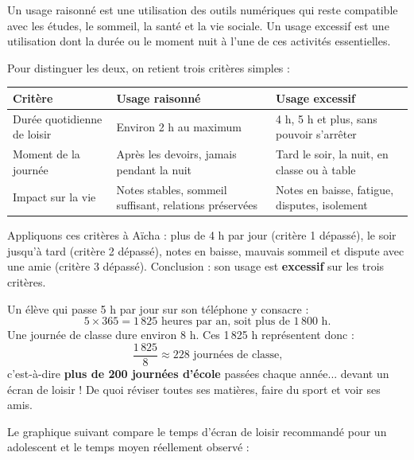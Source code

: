 \documentclass[11pt]{article}
\newcommand{\cle}[1]{{\popxbold\color{popdark}#1}}
\begin{document}
\begin{definition}
Un \cle{usage raisonné} est une utilisation des outils numériques qui reste compatible avec les études, le sommeil, la santé et la vie sociale. Un \cle{usage excessif} est une utilisation dont la durée ou le moment nuit à l'une de ces activités essentielles.
\end{definition}

Pour distinguer les deux, on retient trois critères simples :

\begin{center}
\begin{tabularx}{\linewidth}{|l|X|X|}
\hline
\rowcolor{popblueL} \textbf{Critère} & \textbf{Usage raisonné} & \textbf{Usage excessif} \\
\hline
Durée quotidienne de loisir & Environ 2 h au maximum & 4 h, 5 h et plus, sans pouvoir s'arrêter \\
\hline
Moment de la journée & Après les devoirs, jamais pendant la nuit & Tard le soir, la nuit, en classe ou à table \\
\hline
Impact sur la vie & Notes stables, sommeil suffisant, relations préservées & Notes en baisse, fatigue, disputes, isolement \\
\hline
\end{tabularx}
\end{center}

Appliquons ces critères à Aïcha : plus de 4 h par jour (critère 1 dépassé), le soir jusqu'à tard (critère 2 dépassé), notes en baisse, mauvais sommeil et dispute avec une amie (critère 3 dépassé). Conclusion : son usage est \textbf{excessif} sur les trois critères.

\begin{exemplebox}
Un élève qui passe 5 h par jour sur son téléphone y consacre :
\[ 5 \times 365 = 1\,825 \text{ heures par an, soit plus de } 1\,800 \text{ h.} \]
Une journée de classe dure environ 8 h. Ces 1\,825 h représentent donc :
\[ \frac{1\,825}{8} \approx 228 \text{ journées de classe,} \]
c'est-à-dire \textbf{plus de 200 journées d'école} passées chaque année... devant un écran de loisir ! De quoi réviser toutes ses matières, faire du sport et voir ses amis.
\end{exemplebox}

Le graphique suivant compare le temps d'écran de loisir recommandé pour un adolescent et le temps moyen réellement observé :
\end{document}
